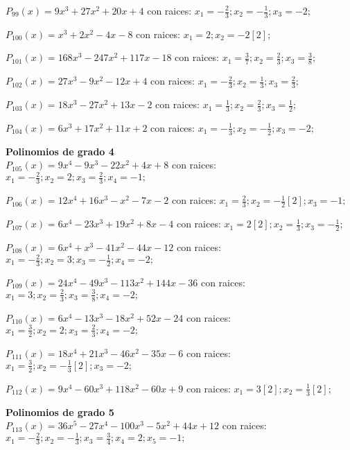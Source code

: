 \subitem $P_{99}(x) = 9x^3 + 27x^2 + 20x + 4$ con raices: $x_1 = -\frac{2}{3} ; x_2 = -\frac{1}{3} ; x_3 = -2 ;  $

\subitem $P_{100}(x) = x^3 + 2x^2 - 4x - 8$ con raices: $x_1 = 2 ; x_2 = -2[2] ;  $

\subitem $P_{101}(x) = 168x^3 - 247x^2 + 117x - 18$ con raices: $x_1 = \frac{3}{7} ; x_2 = \frac{2}{3} ; x_3 = \frac{3}{8} ;  $

\subitem $P_{102}(x) = 27x^3 - 9x^2 - 12x + 4$ con raices: $x_1 = -\frac{2}{3} ; x_2 = \frac{1}{3} ; x_3 = \frac{2}{3} ;  $

\subitem $P_{103}(x) = 18x^3 - 27x^2 + 13x - 2$ con raices: $x_1 = \frac{1}{3} ; x_2 = \frac{2}{3} ; x_3 = \frac{1}{2} ;  $

\subitem $P_{104}(x) = 6x^3 + 17x^2 + 11x + 2$ con raices: $x_1 = -\frac{1}{3} ; x_2 = -\frac{1}{2} ; x_3 = -2 ;  $

\textbf{Polinomios de grado 4\\} 
\subitem $P_{105}(x) = 9x^4 - 9x^3 - 22x^2 + 4x + 8$ con raices: $x_1 = -\frac{2}{3} ; x_2 = 2 ; x_3 = \frac{2}{3} ; x_4 = -1 ;  $

\subitem $P_{106}(x) = 12x^4 + 16x^3 - x^2 - 7x - 2$ con raices: $x_1 = \frac{2}{3} ; x_2 = -\frac{1}{2}[2] ; x_3 = -1 ;  $

\subitem $P_{107}(x) = 6x^4 - 23x^3 + 19x^2 + 8x - 4$ con raices: $x_1 = 2[2] ; x_2 = \frac{1}{3} ; x_3 = -\frac{1}{2} ;  $

\subitem $P_{108}(x) = 6x^4 + x^3 - 41x^2 - 44x - 12$ con raices: $x_1 = -\frac{2}{3} ; x_2 = 3 ; x_3 = -\frac{1}{2} ; x_4 = -2 ;  $

\subitem $P_{109}(x) = 24x^4 - 49x^3 - 113x^2 + 144x - 36$ con raices: $x_1 = 3 ; x_2 = \frac{2}{3} ; x_3 = \frac{3}{8} ; x_4 = -2 ;  $

\subitem $P_{110}(x) = 6x^4 - 13x^3 - 18x^2 + 52x - 24$ con raices: $x_1 = \frac{3}{2} ; x_2 = 2 ; x_3 = \frac{2}{3} ; x_4 = -2 ;  $

\subitem $P_{111}(x) = 18x^4 + 21x^3 - 46x^2 - 35x - 6$ con raices: $x_1 = \frac{3}{2} ; x_2 = -\frac{1}{3}[2] ; x_3 = -2 ;  $

\subitem $P_{112}(x) = 9x^4 - 60x^3 + 118x^2 - 60x + 9$ con raices: $x_1 = 3[2] ; x_2 = \frac{1}{3}[2] ;  $

\textbf{Polinomios de grado 5\\} 
\subitem $P_{113}(x) = 36x^5 - 27x^4 - 100x^3 - 5x^2 + 44x + 12$ con raices: $x_1 = -\frac{2}{3} ; x_2 = -\frac{1}{3} ; x_3 = \frac{3}{4} ; x_4 = 2 ; x_5 = -1 ;  $

